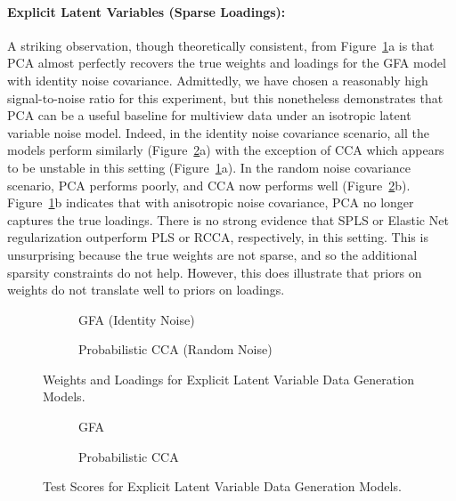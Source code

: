 \paragraph{Explicit Latent Variables (Sparse Loadings):} A striking observation, though theoretically consistent, from Figure~\ref{fig:latent-variable-weights-loadings}a is that PCA almost perfectly recovers the true weights and loadings for the GFA model with identity noise covariance.
Admittedly, we have chosen a reasonably high signal-to-noise ratio for this experiment, but this nonetheless demonstrates that PCA can be a useful baseline for multiview data under an isotropic latent variable noise model.
Indeed, in the identity noise covariance scenario, all the models perform similarly (Figure~\ref{fig:latent-variable-scores}a) with the exception of CCA which appears to be unstable in this setting (Figure~\ref{fig:latent-variable-weights-loadings}a).
In the random noise covariance scenario, PCA performs poorly, and CCA now performs well (Figure~\ref{fig:latent-variable-scores}b).
Figure~\ref{fig:latent-variable-weights-loadings}b indicates that with anisotropic noise covariance, PCA no longer captures the true loadings.
There is no strong evidence that SPLS or Elastic Net regularization outperform PLS or RCCA, respectively, in this setting.
This is unsurprising because the true weights are not sparse, and so the additional sparsity constraints do not help.
However, this does illustrate that priors on weights do not translate well to priors on loadings.

\begin{figure}
\centering
\begin{subfigure}{0.49\linewidth}
\centering

\caption{GFA (Identity Noise)}
\end{subfigure}
%
\begin{subfigure}{0.49\linewidth}
\centering

\caption{Probabilistic CCA (Random Noise)}
\end{subfigure}
\caption{Weights and Loadings for Explicit Latent Variable Data Generation Models.}\label{fig:latent-variable-weights-loadings}
\end{figure}

\begin{figure}
\centering
\begin{subfigure}{0.49\linewidth}
\centering

\caption{GFA}
\end{subfigure}
%
\begin{subfigure}{0.49\linewidth}
\centering

\caption{Probabilistic CCA}
\end{subfigure}
\caption{Test Scores for Explicit Latent Variable Data Generation Models.}\label{fig:latent-variable-scores}
\end{figure}

